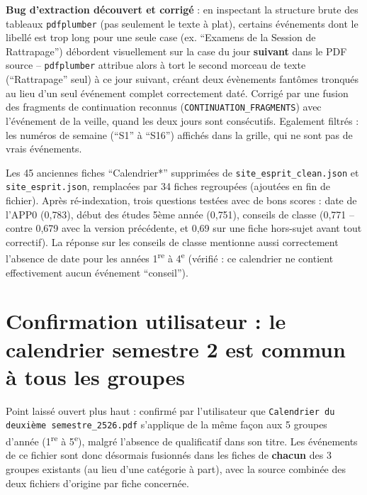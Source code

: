 \documentclass[11pt,a4paper]{report}
\begin{document}
\begin{statutlimite}
\textbf{Bug d'extraction découvert et corrigé} : en inspectant la structure brute des
tableaux \texttt{pdfplumber} (pas seulement le texte à plat), certains événements dont
le libellé est trop long pour une seule case (ex. ``Examens de la Session de
Rattrapage'') débordent visuellement sur la case du jour \textbf{suivant} dans le PDF
source -- \texttt{pdfplumber} attribue alors à tort le second morceau de texte
(``Rattrapage'' seul) à ce jour suivant, créant deux évènements fantômes tronqués au
lieu d'un seul événement complet correctement daté. Corrigé par une fusion des
fragments de continuation reconnus (\texttt{CONTINUATION\_FRAGMENTS}) avec l'événement
de la veille, quand les deux jours sont consécutifs. Egalement filtrés : les numéros de
semaine (``S1'' à ``S16'') affichés dans la grille, qui ne sont pas de vrais événements.
\end{statutlimite}

\begin{statutfait}
Les 45 anciennes fiches ``Calendrier*'' supprimées de \texttt{site\_esprit\_clean.json}
et \texttt{site\_esprit.json}, remplacées par 34 fiches regroupées (ajoutées en fin de
fichier). Après ré-indexation, trois questions testées avec de bons scores : date de
l'APP0 (0{,}783), début des études 5ème année (0{,}751), conseils de classe (0{,}771 --
contre 0{,}679 avec la version précédente, et 0{,}69 sur une fiche hors-sujet avant tout
correctif). La réponse sur les conseils de classe mentionne aussi correctement l'absence
de date pour les années 1\textsuperscript{re} à 4\textsuperscript{e} (vérifié : ce
calendrier ne contient effectivement aucun événement ``conseil'').
\end{statutfait}

\section{Confirmation utilisateur : le calendrier semestre 2 est commun à tous les groupes}

Point laissé ouvert plus haut : confirmé par l'utilisateur que
\texttt{Calendrier du deuxième semestre\_2526.pdf} s'applique de la même façon aux 5
groupes d'année (1\textsuperscript{re} à 5\textsuperscript{e}), malgré l'absence de
qualificatif dans son titre. Les événements de ce fichier sont donc désormais fusionnés
dans les fiches de \textbf{chacun} des 3 groupes existants (au lieu d'une catégorie à
part), avec la source combinée des deux fichiers d'origine par fiche concernée.
\end{document}
